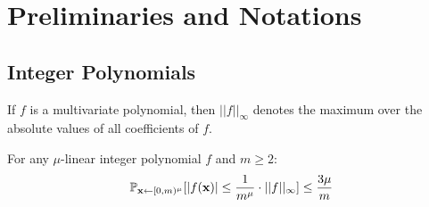 \section{Preliminaries and Notations}
\label{appendix:prelimns}
\subsection{Integer Polynomials} If $f$ is a multivariate polynomial, then $||f||_\infty$ denotes the maximum over the absolute values of all coefficients of $f$. 

\begin{lemma}\label{lem:evalbound} For any $\mu$-linear integer polynomial $f$ and $m \geq 2$:
 $$\mathbb{P}_{\mathbf{x} \gets [0,m)^\mu} [|f(\mathbf{x})|\leq \frac{1}{m^\mu} \cdot ||f||_\infty]\leq \frac{3\mu}{m}$$
 \end{lemma} 

